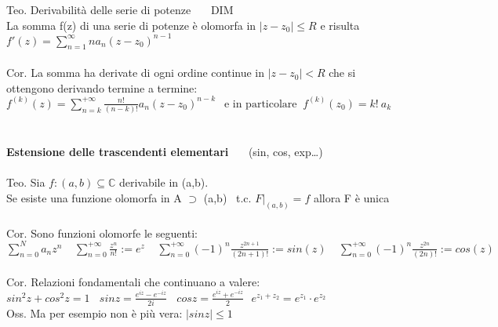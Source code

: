 \documentclass{article}
\theoremstyle{unnumbered}
\theoremstyle{unnumbered1}
\begin{document}
%
%
Teo. Derivabilità delle serie di potenze \ \ \  DIM \\
La somma f(z) di una serie di potenze è olomorfa in $|z-z_0|\le R $ e risulta $f'(z)= \sum_{n=1}^{\infty} na_n(z-z_0)^{n-1}$\\ \\
%
%
Cor.   La somma ha derivate di ogni ordine continue in $|z-z_0|<R$ che si ottengono derivando termine a termine: \ \
$f^{(k)}(z)=\sum_{n=k}^{+\infty} \frac{n!}{(n-k)!}a_n(z-z_0)^{n-k} \ \ \text{ e in particolare } \ f^{(k)}(z_0)=k!\ a_k$\\ \\ \\
%
%
\textbf{Estensione delle trascendenti elementari} \ \ \ (sin, cos, exp…)\\ \\
%
Teo.  Sia $f:(a,b)\subseteq\mathbb{C}$  derivabile in (a,b).\\ Se esiste una funzione olomorfa in A $\supset$ (a,b) \ t.c. $F|_{(a,b)} =f$ allora F è unica\\ \\
%
Cor. Sono funzioni olomorfe le seguenti:\\
$\sum_{n=0}^Na_nz^n \ \ \ \ \ \sum_{n=0}^{+\infty}\frac{z^n}{n!} :=e^z \ \ \ \ \ \sum_{n=0}^{+\infty}(-1)^n\frac{z^{2n+1}}{(2n+1)!} :=sin (z) \ \ \ \ \ \sum_{n=0}^{+\infty}(-1)^n\frac{z^{2n}}{(2n)!} :=cos (z)$\\ \\
%
%
Cor. Relazioni fondamentali che continuano a valere:\\
$sin^2z+cos^2z=1 \ \ \ \ sinz=\frac{e^{iz}-e^{-iz}}{2i} \ \ \ \ cosz=\frac{e^{iz}+e^{-iz}}{2} \ \ \ e^{z_1+z_2}=e^{z_1}\cdot e^{z_2}$\\
%
Oss. Ma per esempio non è più vera: $|sinz|\le 1$\\
\newpage
\end{document}
